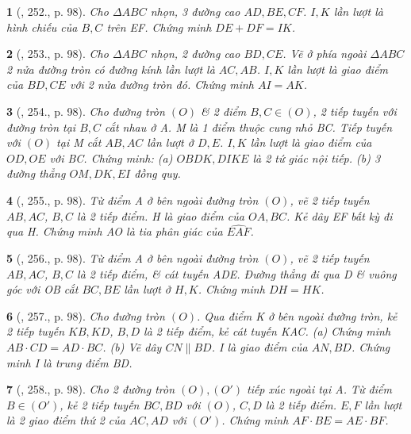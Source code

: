 \documentclass{article}
\newtheorem{baitoan}{}
\begin{document}
\begin{baitoan}[\cite{Binh_Toan_9_tap_2}, 252., p. 98]
	Cho $\Delta ABC$ nhọn, 3 đường cao $AD,BE,CF$. $I,K$ lần lượt là hình chiếu của $B,C$ trên EF. Chứng minh $DE + DF = IK$.
\end{baitoan}

\begin{baitoan}[\cite{Binh_Toan_9_tap_2}, 253., p. 98]
	Cho $\Delta ABC$ nhọn, 2 đường cao $BD,CE$. Vẽ ở phía ngoài $\Delta ABC$ 2 nửa đường tròn có đường kính lần lượt là $AC,AB$. $I,K$ lần lượt là giao điểm của $BD,CE$ với 2 nửa đường tròn đó. Chứng minh $AI = AK$.
\end{baitoan}

\begin{baitoan}[\cite{Binh_Toan_9_tap_2}, 254., p. 98]
	Cho đường tròn $(O)$ \& 2 điểm $B,C\in(O)$, 2 tiếp tuyến với đường tròn tại $B,C$ cắt nhau ở A. M là 1 điểm thuộc cung nhỏ BC. Tiếp tuyến với $(O)$ tại M cắt $AB,AC$ lần lượt ở $D,E$. $I,K$ lần lượt là giao điểm của $OD,OE$ với BC. Chứng minh: (a) $OBDK,DIKE$ là 2 tứ giác nội tiếp. (b) 3 đường thẳng $OM,DK,EI$ đồng quy.
\end{baitoan}

\begin{baitoan}[\cite{Binh_Toan_9_tap_2}, 255., p. 98]
	Từ điểm A ở bên ngoài đường tròn $(O)$, vẽ 2 tiếp tuyến $AB,AC$, $B,C$ là 2 tiếp điểm. H là giao điểm của $OA,BC$. Kẻ dây EF bất kỳ đi qua H. Chứng minh AO là tia phân giác của $\widehat{EAF}$.
\end{baitoan}

\begin{baitoan}[\cite{Binh_Toan_9_tap_2}, 256., p. 98]
	Từ điểm A ở bên ngoài đường tròn $(O)$, vẽ 2 tiếp tuyến $AB,AC$, $B,C$ là 2 tiếp điểm, \& cát tuyến ADE. Đường thẳng đi qua D \& vuông góc với OB cắt $BC,BE$ lần lượt ở $H,K$. Chứng minh $DH = HK$.
\end{baitoan}

\begin{baitoan}[\cite{Binh_Toan_9_tap_2}, 257., p. 98]
	Cho đường tròn $(O)$. Qua điểm K ở bên ngoài đường tròn, kẻ 2 tiếp tuyến $KB,KD$, $B,D$ là 2 tiếp điểm, kẻ cát tuyến KAC. (a) Chứng minh $AB\cdot CD = AD\cdot BC$. (b) Vẽ dây $CN\parallel BD$. I là giao điểm của $AN,BD$. Chứng minh I là trung điểm BD.
\end{baitoan}

\begin{baitoan}[\cite{Binh_Toan_9_tap_2}, 258., p. 98]
	Cho 2 đường tròn $(O),(O')$ tiếp xúc ngoài tại A. Từ điểm $B\in(O')$, kẻ 2 tiếp tuyến $BC,BD$ với $(O)$, $C,D$ là 2 tiếp điểm. $E,F$ lần lượt là 2 giao điểm thứ 2 của $AC,AD$ với $(O')$. Chứng minh $AF\cdot BE = AE\cdot BF$.
\end{baitoan}
\end{document}
